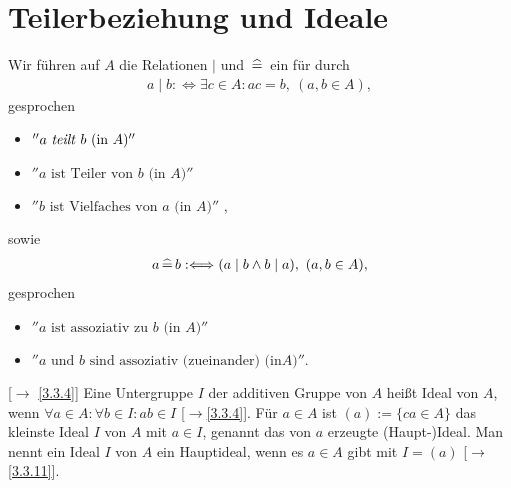 \documentclass[../../main.tex]{subfiles}
\begin{document}
\section{Teilerbeziehung und Ideale}

\begin{df}\label{16.1.1}
Wir führen auf $A$ die Relationen \emph{$\mid$} und \emph{$\,\widehat{=}\,$} ein für durch
\begin{align*}
a\mid b:\Longleftrightarrow \exists c\in A: ac=b,\ (a,b\in A),
\end{align*}
gesprochen
\begin{itemize}
\item $''a\text{ \emph{teilt}\index{Teilbarkeit@{\bf Teilbarkeit}!Teiler} }b\text{ (in }A)''$
\item $''a\text{ ist Teiler von }b\text{ (in }A)''$
\item $''b\text{ ist Vielfaches von }a\text{ (in }A)''$ ,
\end{itemize}
sowie
\begin{align*}
a\,\widehat{=}\, b:\Longleftrightarrow (a\mid b\land b\mid a),\ (a,b\in A),
\end{align*}
gesprochen
\begin{itemize}
\item $''a\text{ ist assoziativ zu } b\text{ (in }A)''$
\item $''a\text{ und }b\text{ sind assoziativ (zueinander) (in}A)''$.
\end{itemize}
\end{df}
	
\begin{er}\mbox{}[$\to$ \ref{3.3.4}]\label{16.1.2} 
Eine Untergruppe $I$ der additiven Gruppe von $A$ heißt Ideal von $A$, wenn $\forall a\in A: \forall b\in I: ab\in I$ [$\to$\ref{3.3.4}]. Für $a\in A$ ist $(a):=\{ca\in A\}$ das kleinste Ideal $I$ von $A$ mit $a\in I$, genannt das von $a$ erzeugte (Haupt-)Ideal. Man nennt ein Ideal $I$ von $A$ ein Hauptideal, wenn es $a\in A$ gibt mit $I=(a)$ [$\to$\ref{3.3.11}].
\end{er}
\end{document}
